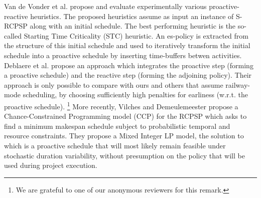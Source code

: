 	Van de Vonder et al. \cite{van2006trade,van2008,van2007heuristic} propose and
	evaluate experimentally various proactive-reactive heuristics.
	The proposed heuristics assume as input an instance of S-RCPSP along with an initial schedule.
	The best performing heuristic is the so-called Starting Time Criticality (STC) heuristic.
	An es-policy is extracted from the structure of this initial schedule and used to
	iteratively transform the initial schedule into a 
	proactive schedule by inserting time-buffers betwen activities.
	Deblaere et al. \cite{deblaere2011proactive} propose 
	an approach which integrates the proactive step (forming a proactive schedule) 
	and the reactive step (forming the adjoining policy).
	Their approach is only possible to compare with ours and others that assume railway-mode scheduling,
	by choosing sufficiently high penalties for earliness (w.r.t. the proactive schedule).%
	\footnote{We are grateful to one of our anonymous reviewers for this remark.}
	More recently, Vilches and Demeulemeester  \cite{lamas2015}
	propose a Chance-Constrained Programming model (CCP) for the RCPSP
	which asks to find a minimum makespan schedule
	subject to probabilistic temporal and resource constraints.
	They propose a Mixed Integer LP model, 
	the solution to which is a proactive schedule that will most likely remain 
	feasible under stochastic duration variability,
	without presumption on the policy that will be used during project execution.
